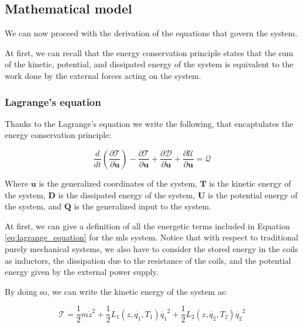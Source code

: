 \subsection{Mathematical model}
\label{subsec:mathematical_model}

We can now proceed with the derivation of the equations that govern the system.

At first, we can recall that the energy conservation principle states that the sum of the kinetic, potential, and dissipated energy of the system is equivalent to the work done by the external forces acting on the system.

\subsubsection{Lagrange's equation}
\label{subsubsec:lagrange_equation}

Thanks to the Lagrange's equation we write the following, that encaptulates the energy conservation principle:

\begin{equation}
    \frac{d}{dt} \left( \frac{\partial \mathcal{T}}{\partial \dot{\mathbf{u}}} \right) - \frac{\partial \mathcal{T}}{\partial \mathbf{u}} + \frac{\partial \mathcal{D}}{\partial \dot{\mathbf{u}}} + \frac{\partial \mathcal{U}}{\partial \mathbf{u}} = \mathcal{Q}
    \label{eq:lagrange_equation}
\end{equation}

Where $\mathbf{u}$ is the generalized coordinates of the system, $\mathbf{T}$ is the kinetic energy of the system, $\mathbf{D}$ is the dissipated energy of the system, $\mathbf{U}$ is the potential energy of the system, and $\mathbf{Q}$ is the generalized input to the system.

At first, we can give a definition of all the energetic terms included in Equation \ref{eq:lagrange_equation} for the \acrshort{mls} system.
Notice that with respect to traditional purely mechanical systems, we also have to consider the stored energy in the coils as inductors, the dissipation due to the resistance of the coils, and the potential energy given by the external power supply.

By doing so, we can write the kinetic energy of the system as:

\begin{equation}
    \mathcal{T} = \frac{1}{2} m \dot{z}^2 + \frac{1}{2} L_1(z, \dot{q_1}, T_1) \dot{q_1}^2 + \frac{1}{2} L_2(z, \dot{q_2}, T_2) \dot{q_2}^2
    \label{eq:kinetic_energy}
\end{equation}

